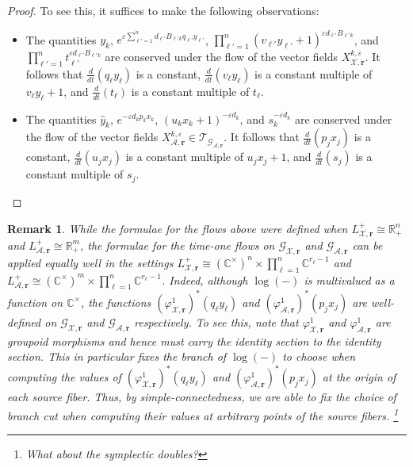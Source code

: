 \documentclass{amsart}
\newtheorem{remark}[theorem]{Remark}
\numberwithin{equation}{section}
\newcommand{\bfr}{{\boldsymbol{r}}}
\newcommand{\cA}{\mathcal{A}}
\newcommand{\cG}{\mathcal{G}}
\newcommand{\cT}{\mathcal{T}}
\newcommand{\cX}{\mathcal{X}}
\newcommand{\CC}{\mathbb{C}}
\newcommand{\RR}{\mathbb{R}}
\begin{document}
\begin{proof}
  To see this, it suffices to make the following observations:
  \begin{itemize}
    \item The quantities $y_k$, $e^{\varepsilon\sum_{\ell'=1}^n d_{\ell'} B_{\ell' k}q_{\ell'} y_{\ell'}}$, $\prod_{\ell'=1}^n (v_{\ell'}y_{\ell'}+1)^{\varepsilon d_{\ell'} B_{\ell' k}}$, and $\prod_{\ell'=1}^nt_{\ell'}^{\varepsilon d_{\ell'} B_{\ell' k}}$ are conserved under the flow of the vector fields $X_{\cX,\bfr}^{k,\varepsilon}$.
      It follows that $\frac{d}{dt}(q_\ell y_\ell)$ is a constant, $\frac{d}{dt}(v_\ell y_\ell)$ is a constant multiple of $v_\ell y_\ell+1$, and $\frac{d}{dt}(t_\ell)$ is a constant multiple of $t_\ell$.
    \item The quantities $\hat y_k$, $e^{-\varepsilon d_kp_kx_k}$, $(u_kx_k+1)^{-\varepsilon d_k}$, and $s_k^{-\varepsilon d_k}$ are conserved under the flow of the vector fields $X_{\cA,\bfr}^{k,\varepsilon}\in\cT_{\cG_{\cA,\bfr}}$.
      It follows that $\frac{d}{dt}(p_jx_j)$ is a constant, $\frac{d}{dt}(u_j x_j)$ is a constant multiple of $u_j x_j+1$, and $\frac{d}{dt}(s_j)$ is a constant multiple of $s_j$.
  \end{itemize}
\end{proof}
\begin{remark}
  While the formulae for the flows above were defined when $L^+_{\cX,\bfr}\cong\RR_+^n$ and $L^+_{\cA,\bfr}\cong\RR_+^m$, the formulae for the time-one flows on $\cG_{\cX,\bfr}$ and $\cG_{\cA,\bfr}$ can be applied equally well in the settings $L^+_{\cX,\bfr}\cong(\CC^\times)^n\times\prod_{\ell=1}^n \CC^{r_\ell-1}$ and $L^+_{\cA,\bfr}\cong(\CC^\times)^m\times\prod_{\ell=1}^n \CC^{r_\ell-1}$.
  Indeed, although $\log(-)$ is multivalued as a function on $\CC^\times$, the functions $(\varphi_{\cX,\bfr}^1)^*(q_\ell y_\ell)$ and $(\varphi_{\cA,\bfr}^1)^*(p_jx_j)$ are well-defined on $\cG_{\cX,\bfr}$ and $\cG_{\cA,\bfr}$ respectively.
  To see this, note that $\varphi_{\cX,\bfr}^1$ and $\varphi_{\cA,\bfr}^1$ are groupoid morphisms and hence must carry the identity section to the identity section.
  This in particular fixes the branch of $\log(-)$ to choose when computing the values of $(\varphi_{\cX,\bfr}^1)^*(q_\ell y_\ell)$ and $(\varphi_{\cA,\bfr}^1)^*(p_jx_j)$ at the origin of each source fiber.
  Thus, by simple-connectedness, we are able to fix the choice of branch cut when computing their values at arbitrary points of the source fibers. 
  \footnote{What about the symplectic doubles?}
\end{remark}
  
\end{document}
